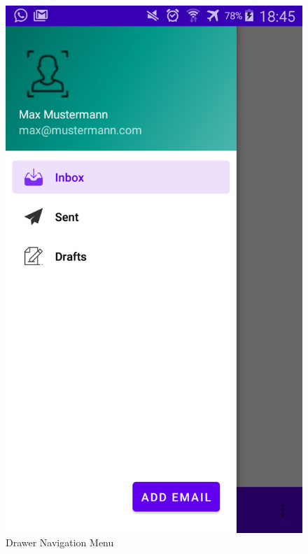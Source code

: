 \documentclass[a4paper,11pt]{article}
\begin{document}
\begin{figure}
\centering
\includegraphics[scale=.15]{media/drawer.png}
\caption{Drawer Navigation Menu}
\end{figure}
\end{document}

